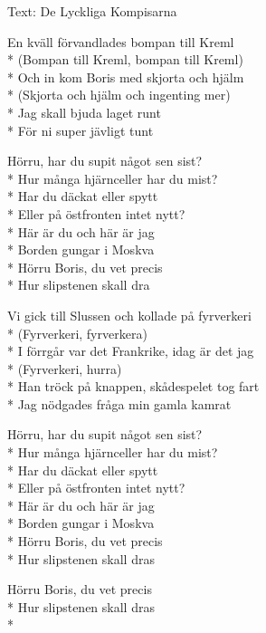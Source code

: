 \begin{SongText}
    \begin{SongInfo}
        Text: De Lyckliga Kompisarna
    \end{SongInfo}
    \begin{SongVerse}
        En kväll förvandlades bompan till Kreml\\*%
        (Bompan till Kreml, bompan till Kreml)\\*%
        Och in kom Boris med skjorta och hjälm\\*%
        (Skjorta och hjälm och ingenting mer)\\*%
        Jag skall bjuda laget runt\\*%
        För ni super jävligt tunt
    \end{SongVerse}
    \begin{SongVerse}
        Hörru, har du supit något sen sist?\\*%
        Hur många hjärnceller har du mist?\\*%
        Har du däckat eller spytt\\*%
        Eller på östfronten intet nytt?\\*%
        Här är du och här är jag\\*%
        Borden gungar i Moskva\\*%
        Hörru Boris, du vet precis\\*%
        Hur slipstenen skall dra
    \end{SongVerse}
    \begin{SongVerse}
        Vi gick till Slussen och kollade på fyrverkeri\\*%
        (Fyrverkeri, fyrverkera)\\*%
        I förrgår var det Frankrike, idag är det jag\\*%
        (Fyrverkeri, hurra)\\*%
        Han tröck på knappen, skådespelet tog fart\\*%
        Jag nödgades fråga min gamla kamrat
    \end{SongVerse}
    \begin{SongVerse}
        Hörru, har du supit något sen sist?\\*%
        Hur många hjärnceller har du mist?\\*%
        Har du däckat eller spytt\\*%
        Eller på östfronten intet nytt?\\*%
        Här är du och här är jag\\*%
        Borden gungar i Moskva\\*%
        Hörru Boris, du vet precis\\*%
        Hur slipstenen skall dras
    \end{SongVerse}
    \begin{SongVerse}
        Hörru Boris, du vet precis\\*%
        Hur slipstenen skall dras\\*%
    \end{SongVerse}
\end{SongText}
\newpage